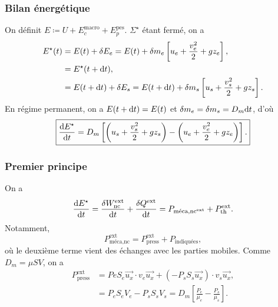         \subsubsection{Bilan énergétique}

            On définit $E\coloneqq U+E_c^{\text{macro}}+E_p^{\text{pes}}$. $\Sigma^{\star}$ étant fermé, on a 
            \begin{align}
                E^{\star}(t)
                &=E(t)+\delta E_e=E(t)+\delta m_e\left[u_e+\frac{v_e^{2}}{2}+gz_e\right],\\
                &=E^{\star}(t+\mathrm{d} t),\\
                &= E(t+\mathrm{d} t)+\delta E_s=E(t+\mathrm{d} t)+\delta m_s\left[u_s+\frac{v_s^{2}}{2}+g z_s\right].
            \end{align}
            En régime permanent, on a $E(t+\mathrm{d} t)=E(t)$ et $\delta m_e=\delta m_s=D_m\mathrm{d} t$, d'où
            \begin{equation}
                \boxed{
                    \frac{\mathrm{d} E^{\star}}{\mathrm{d} t}=D_m\left[\left(u_s+\frac{v_s^{2}}{2}+g z_s\right)-\left(u_e+\frac{v_e^{2}}{2}+g z_e\right)\right].
                }
            \end{equation}

        \subsubsection{Premier principe}

            On a 
            \begin{equation}
                \frac{\mathrm{d} E^{\star}}{\mathrm{d} t}=\frac{\delta W_{\text{nc}}^{\text{ext}}}{\mathrm{d} t}+\frac{\delta Q^{\text{ext}}}{\mathrm{d} t}=P_{\text{méca,nc}^{\text{ext}}}+P_{\text{th}}^{\text{ext}}.
            \end{equation}
            Notamment, 
            \begin{equation}
                P_{\text{méca,nc}}^{\text{ext}}=P_{\text{press}}^{\text{ext}}+P_{\text{indiquées}},
            \end{equation}
            où le deuxième terme vient des échanges avec les parties mobiles. Comme $D_m=\mu SV$, on a 
            \begin{align}
                P_{\text{press}}^{\text{ext}}
                &=Pe S_e\vec{u_x}\cdot v_e\vec{u_x}+(-P_s S_s\vec{u_x})\cdot v_s\vec{u_x},\\
                &=P_e S_e V_e-P_s S_s V_s = D_m\left[\frac{P_e}{\mu_e}-\frac{P_s}{\mu_s}\right].
            \end{align}

